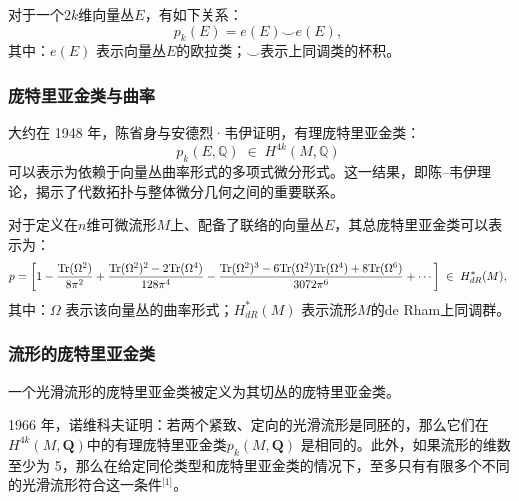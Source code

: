 对于一个$2k$维向量丛$E$，有如下关系：
$$
p_k(E) = e(E) \smile e(E),~
$$
其中：$e(E)$ 表示向量丛$E$的欧拉类；$\smile$表示上同调类的杯积。
\subsubsection{庞特里亚金类与曲率}
大约在 1948 年，陈省身与安德烈·韦伊证明，有理庞特里亚金类：
$$
p_k(E, \mathbb{Q}) \;\in\; H^{4k}(M, \mathbb{Q})~
$$
可以表示为依赖于向量丛曲率形式的多项式微分形式。这一结果，即陈–韦伊理论，揭示了代数拓扑与整体微分几何之间的重要联系。

对于定义在$n$维可微流形$M$上、配备了联络的向量丛$E$，其总庞特里亚金类可以表示为：
$$
p = \left[
1
-\frac{{\rm Tr}(\Omega^2)}{8\pi^2}
+\frac{{\rm Tr}(\Omega^2)^2 - 2{\rm Tr}(\Omega^4)}{128\pi^4}
-\frac{{\rm Tr}(\Omega^2)^3 - 6{\rm Tr}(\Omega^2){\rm Tr}(\Omega^4) + 8{\rm Tr}(\Omega^6)}{3072\pi^6}
+\cdots
\right]
\;\in\; H_{dR}^*(M),~
$$
其中：$\Omega$ 表示该向量丛的曲率形式；$H_{dR}^*(M)$ 表示流形$M$的de Rham上同调群。
\subsubsection{流形的庞特里亚金类}
一个光滑流形的庞特里亚金类被定义为其切丛的庞特里亚金类。

1966 年，诺维科夫证明：若两个紧致、定向的光滑流形是同胚的，那么它们在$H^{4k}(M, \mathbf{Q})$中的有理庞特里亚金类$p_k(M, \mathbf{Q})$ 是相同的。此外，如果流形的维数至少为 5，那么在给定同伦类型和庞特里亚金类的情况下，至多只有有限多个不同的光滑流形符合这一条件\(^\text{[1]}\)。
